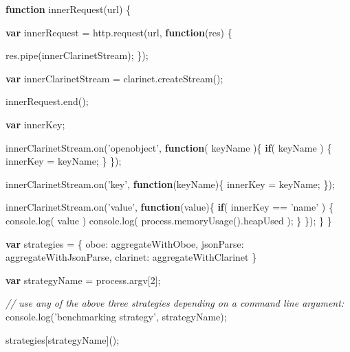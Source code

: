 \documentclass[12pt, ]{article}
\newenvironment{Shaded}{}{}
\newcommand{\KeywordTok}[1]{\textcolor[rgb]{0.00,0.44,0.13}{\textbf{{#1}}}}
\newcommand{\DataTypeTok}[1]{\textcolor[rgb]{0.56,0.13,0.00}{{#1}}}
\newcommand{\DecValTok}[1]{\textcolor[rgb]{0.25,0.63,0.44}{{#1}}}
\newcommand{\StringTok}[1]{\textcolor[rgb]{0.25,0.44,0.63}{{#1}}}
\newcommand{\CommentTok}[1]{\textcolor[rgb]{0.38,0.63,0.69}{\textit{{#1}}}}
\newcommand{\OtherTok}[1]{\textcolor[rgb]{0.00,0.44,0.13}{{#1}}}
\newcommand{\FunctionTok}[1]{\textcolor[rgb]{0.02,0.16,0.49}{{#1}}}
\newcommand{\NormalTok}[1]{{#1}}
\begin{document}
\begin{Shaded}
\begin{Highlighting}[]
   
   \KeywordTok{function} \FunctionTok{innerRequest}\NormalTok{(url) \{}
      
      \KeywordTok{var} \NormalTok{innerRequest = }\OtherTok{http}\NormalTok{.}\FunctionTok{request}\NormalTok{(url, }\KeywordTok{function}\NormalTok{(res) \{}
                                 
         \OtherTok{res}\NormalTok{.}\FunctionTok{pipe}\NormalTok{(innerClarinetStream);}
      \NormalTok{\});}
      
      \KeywordTok{var} \NormalTok{innerClarinetStream = }\OtherTok{clarinet}\NormalTok{.}\FunctionTok{createStream}\NormalTok{();}
      
      \OtherTok{innerRequest}\NormalTok{.}\FunctionTok{end}\NormalTok{();            }
      
      \KeywordTok{var} \NormalTok{innerKey;}
      
      \OtherTok{innerClarinetStream}\NormalTok{.}\FunctionTok{on}\NormalTok{(}\StringTok{'openobject'}\NormalTok{, }\KeywordTok{function}\NormalTok{( keyName )\{      }
         \KeywordTok{if}\NormalTok{( keyName ) \{}
            \NormalTok{innerKey = keyName;      }
         \NormalTok{\}}
      \NormalTok{\});}
      
      \OtherTok{innerClarinetStream}\NormalTok{.}\FunctionTok{on}\NormalTok{(}\StringTok{'key'}\NormalTok{, }\KeywordTok{function}\NormalTok{(keyName)\{}
         \NormalTok{innerKey = keyName;}
      \NormalTok{\});}
      
      \OtherTok{innerClarinetStream}\NormalTok{.}\FunctionTok{on}\NormalTok{(}\StringTok{'value'}\NormalTok{, }\KeywordTok{function}\NormalTok{(value)\{}
         \KeywordTok{if}\NormalTok{( innerKey == }\StringTok{'name'} \NormalTok{) \{}
            \OtherTok{console}\NormalTok{.}\FunctionTok{log}\NormalTok{( value )}
            \OtherTok{console}\NormalTok{.}\FunctionTok{log}\NormalTok{( }\OtherTok{process}\NormalTok{.}\FunctionTok{memoryUsage}\NormalTok{().}\FunctionTok{heapUsed} \NormalTok{);            }
         \NormalTok{\}}
      \NormalTok{\});            }
   \NormalTok{\}}
\NormalTok{\}}

\KeywordTok{var} \NormalTok{strategies = \{}
   \DataTypeTok{oboe}\NormalTok{:       aggregateWithOboe,}
   \DataTypeTok{jsonParse}\NormalTok{:  aggregateWithJsonParse,}
   \DataTypeTok{clarinet}\NormalTok{:   aggregateWithClarinet}
\NormalTok{\}}

\KeywordTok{var} \NormalTok{strategyName = }\OtherTok{process}\NormalTok{.}\FunctionTok{argv}\NormalTok{[}\DecValTok{2}\NormalTok{];}

\CommentTok{// use any of the above three strategies depending on a command line argument:}
\OtherTok{console}\NormalTok{.}\FunctionTok{log}\NormalTok{(}\StringTok{'benchmarking strategy'}\NormalTok{, strategyName);}

\NormalTok{strategies[strategyName]();}

\end{Highlighting}
\end{Shaded}
\end{document}
